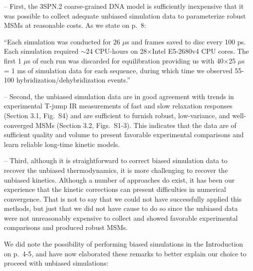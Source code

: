 \documentclass[11pt,a4paper]{letter} %
\begin{document}
-- First, the 3SPN.2 coarse-grained DNA model is sufficiently inexpensive that it was possible to collect adequate unbiased simulation data to parameterize robust MSMs at reasonable costs. As we state on p.~8: 

``Each simulation was conducted for 26 $\mu$s and frames saved to disc every 100 ps. Each simulation required $\sim$24 CPU-hours on 28$\times$Intel E5-2680v4 CPU cores. The first 1 $\mu$s of each run was discarded for equilibration providing us with 40$\times$25 $\mu$s = 1 ms of simulation data for each sequence, during which time we observed 55-100 hybridization/dehybridization events.''

-- Second, the unbiased simulation data are in good agreement with trends in experimental T-jump IR measurements of fast and slow relaxation responses (Section 3.1, Fig.~S4) and are sufficient to furnish robust, low-variance, and well-converged MSMs (Section 3.2, Figs.~S1-3). This indicates that the data are of sufficient quality and volume to present favorable experimental comparisons and learn reliable long-time kinetic models.

-- Third, although it is straightforward to correct biased simulation data to recover the unbiased thermodynamics, it is more challenging to recover the unbiased kinetics. Although a number of approaches do exist, it has been our experience that the kinetic corrections can present difficulties in numerical convergence. That is not to say that we could not have successfully applied this methods, but just that we did not have cause to do so since the unbiased data were not unreasonably expensive to collect and showed favorable experimental comparisons and produced robust MSMs.

We did note the possibility of performing biased simulations in the Introduction on p.~4-5, and have now elaborated these remarks to better explain our choice to proceed with unbiased simulations:
\end{document}
